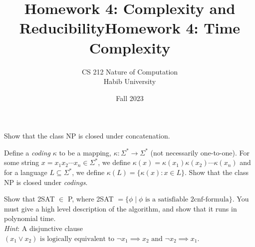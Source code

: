 \documentclass[addpoints,a4paper]{exam}
\title{Homework 4: Complexity and Reducibility}
\title{Homework 4: Time Complexity}
\author{CS 212 Nature of Computation\\Habib University}
\date{Fall 2023}
\begin{document}
\maketitle

\begin{questions}
  

\question


\question Show that the class NP is closed under concatenation.

        \question Define a \textit{coding} $\kappa$ to be a mapping,  $\kappa:\Sigma^*\rightarrow \Sigma^*$ (not necessarily one-to-one). For some string $x = x_1x_2\cdots x_n\in\Sigma^*$, we define $\kappa(x) = \kappa(x_1)\kappa(x_2)\cdots\kappa(x_n)$ and for a language $L\subseteq \Sigma^*$, we define $\kappa(L) = \{\kappa(x): x\in L \}$. Show that the class NP is closed under \textit{codings}. 


\question Show that 2SAT $\in$  P, where 2SAT $ = \{ \phi \mid \phi \text{ is a satisfiable 2cnf-formula}\}$. You must give a high level description of the algorithm, and show that it runs in polynomial time. \\ \textit{Hint}: A disjunctive clause $(x_1 \vee x_2) \text{ is logically equivalent to } \neg x_1 \implies x_2 \text{ and } \neg x_2 \implies x_1$.

\end{questions}
\end{document}
